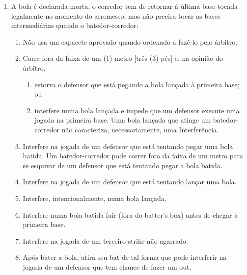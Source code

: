 \begin{multicols}{2}
\begin{enumerate}[label=\alph*)]
\begin{enumerate}[label=\roman*.]
			\item Desvia mais de um (1) metro [tr\^es (3) p\'es] do caminho da base para evitar ser tocado com a bola na (s) m\~ao (s) de um defensor. 
			\item Quando qualquer pessoa, exceto outro corredor, presta ajuda f\'isica a um corredor numa bola \gls{fly} (o batedor-corredor \'e declarado \gls{out} se essa bola \'e 
			pega). 
		\end{enumerate}
		\item A bola \'e declarada morta, o corredor tem de retornar \`a \'ultima base tocada legalmente no momento do arremesso, mas n\~ao precisa tocar as bases intermedi\'arias quando o batedor-corredor: 
		\begin{enumerate}[label=\roman*.]
			\item N\~ao usa um capacete aprovado quando ordenado a faz\^e-lo pelo \'arbitro. 
			\item Corre fora da faixa de um (1) metro [tr\^es (3) p\'es] e, na opini\~ao do \'arbitro, 
			\begin{enumerate}[label=\arabic*)]
				\item estorva o defensor que est\'a pegando a bola lan\c{c}ada \`a primeira base; 
				ou 
				\item  interfere numa bola lan\c{c}ada e impede que um defensor execute uma jogada na primeira base. Uma bola lan\c{c}ada que atinge um batedor-	corredor n\~ao caracteriza, necessariamente, uma Interfer\^encia. 
			\end{enumerate}	
			\item Interfere na jogada de um defensor que est\'a tentando pegar uma bola batida. Um batedor-corredor pode correr fora da faixa de um metro para se esquivar de um defensor que est\'a tentando pegar a bola batida. 
			
			\item Interfere na jogada de um defensor que est\'a tentando lan\c{c}ar uma bola. 
			
			\item Interfere, intencionalmente, numa bola lan\c{c}ada. 
			
			\item Interfere numa bola batida \gls{fair} (fora do \gls{batter's box}) antes de chegar \`a primeira base. 
			
			\item Interfere na jogada de um terceiro \gls{strike} n\~ao agarrado. 
			
			\item Ap\'os bater a bola, atira seu \gls{bat} de tal forma que pode interferir na jogada de um defensor que tem chance de fazer um \gls{out}. 
			

\end{enumerate}
\end{enumerate}
\end{multicols}
